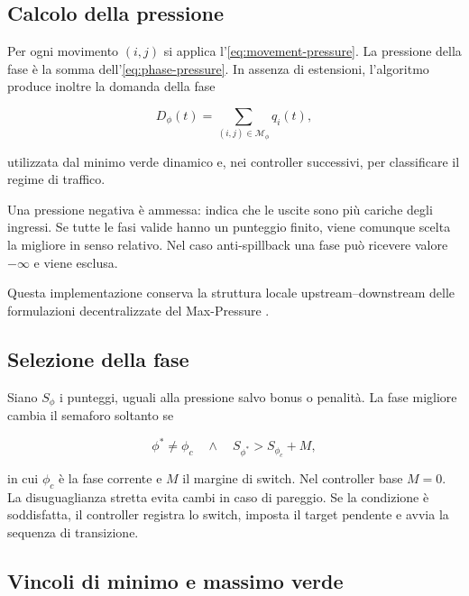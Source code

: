 \documentclass[12pt,a4paper,oneside]{report}
\numberwithin{equation}{chapter}
\begin{document}
\subsection{Calcolo della pressione}

Per ogni movimento $(i,j)$ si applica l'\cref{eq:movement-pressure}. La
pressione della fase è la somma dell'\cref{eq:phase-pressure}. In assenza di
estensioni, l'algoritmo produce inoltre la domanda della fase

\begin{equation}
    D_\phi(t)=\sum_{(i,j)\in\mathcal{M}_\phi}q_i(t),
    \label{eq:phase-demand}
\end{equation}

utilizzata dal minimo verde dinamico e, nei controller successivi, per
classificare il regime di traffico.

Una pressione negativa è ammessa: indica che le uscite sono più cariche degli
ingressi. Se tutte le fasi valide hanno un punteggio finito, viene comunque
scelta la migliore in senso relativo. Nel caso anti-spillback una fase può
ricevere valore $-\infty$ e viene esclusa.

Questa implementazione conserva la struttura locale upstream--downstream delle
formulazioni decentralizzate del Max-Pressure
\cite{varaiya2013maxpressure,wongpiromsarn2012distributed}.

\subsection{Selezione della fase}

Siano $S_\phi$ i punteggi, uguali alla pressione salvo bonus o penalità. La
fase migliore cambia il semaforo soltanto se

\begin{equation}
    \phi^*\neq\phi_c
    \quad\land\quad
    S_{\phi^*}>S_{\phi_c}+M,
    \label{eq:switch-condition}
\end{equation}

in cui $\phi_c$ è la fase corrente e $M$ il margine di switch. Nel controller
base $M=0$. La disuguaglianza stretta evita cambi in caso di pareggio. Se la
condizione è soddisfatta, il controller registra lo switch, imposta il target
pendente e avvia la sequenza di transizione.

\subsection{Vincoli di minimo e massimo verde}
\end{document}
